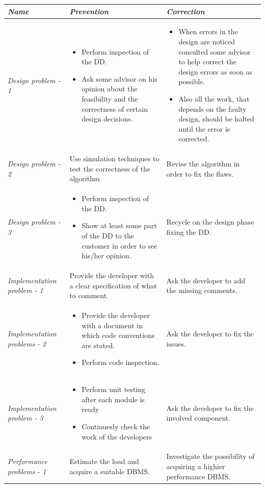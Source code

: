 \begin{landscape}
\begin{tabular}{>{\raggedright}p{4cm}|>{\raggedright}p{10cm}|>{\raggedright}p{8cm}}
\hline 
\emph{Name} & \emph{Prevention} & \emph{Correction}\tabularnewline
\hline 
\hline 
\emph{Design problem - 1} & \begin{itemize}
\item {\small{}Perform inspection of the DD.}{\small \par}
\item {\small{}Ask some advisor on his opinion about the feasibility and
the correctness of certain design decisions.}\end{itemize}
 & \begin{itemize}
\item {\small{}When errors in the design are noticed consulted some advisor
to help correct the design errors as soon as possible. }{\small \par}
\item {\small{}Also all the work, that depends on the faulty design, should
be halted until the error is corrected.}\end{itemize}
\tabularnewline
\hline 
\emph{Design problem - 2} & {\small{}Use simulation techniques to test the correctness of the
algorithm} & {\small{}Revise the algorithm in order to fix the flaws.}\tabularnewline
\hline 
\emph{Design problem - 3} & \begin{itemize}
\item {\small{}Perform inspection of the DD.}{\small \par}
\item {\small{}Show at least some part of the DD to the customer in order
to see his/her opinion.}\end{itemize}
 & {\small{}Recycle on the design phase fixing the DD.}\tabularnewline
\hline 
\emph{Implementation problem - 1} & {\small{}Provide the developer with a clear specification of what
to comment.} & {\small{}Ask the developer to add the missing comments.}\tabularnewline
\hline 
\emph{Implementation problems - 2} & \begin{itemize}
\item {\small{}Provide the developer with a document in which code conventions
are stated.}{\small \par}
\item {\small{}Perform code inspection.}\end{itemize}
 & {\small{}Ask the developer to fix the issues.}\tabularnewline
\hline 
\emph{Implementation problem - 3} & \begin{itemize}
\item {\small{}Perform unit testing after each module is ready}{\small \par}
\item {\small{}Continuesly check the work of the developers}\end{itemize}
 & {\small{}Ask the developer to fix the involved component.}\tabularnewline
\hline 
\emph{Performance problems - 1} & {\small{}Estimate the load and acquire a suitable DBMS.} & {\small{}Investigate the possibility of acquiring a highier performance
DBMS.}\tabularnewline
\hline 
\end{tabular}

\end{landscape}
